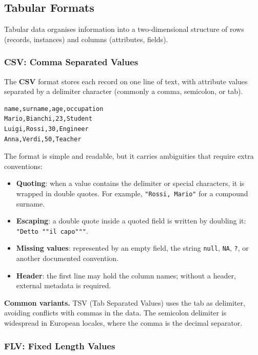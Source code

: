 \subsection{Tabular Formats}
\label{sec:tabular-formats}

Tabular data organises information into a two-dimensional structure of rows (records, instances) and columns (attributes, fields).

\subsubsection{CSV: Comma Separated Values}
\label{subsec:csv-format}

The \textbf{CSV} format stores each record on one line of text, with attribute values separated by a delimiter character (commonly a comma, semicolon, or tab).

\begin{lstlisting}[language={}, basicstyle=\ttfamily\scriptsize]
name,surname,age,occupation
Mario,Bianchi,23,Student
Luigi,Rossi,30,Engineer
Anna,Verdi,50,Teacher
\end{lstlisting}

The format is simple and readable, but it carries ambiguities that require extra conventions:

\begin{itemize}
    \item \textbf{Quoting}: when a value contains the delimiter or special characters, it is wrapped in double quotes. For example, \texttt{"Rossi, Mario"} for a compound surname.
    \item \textbf{Escaping}: a double quote inside a quoted field is written by doubling it: \texttt{"Detto ""il capo"""}.
    \item \textbf{Missing values}: represented by an empty field, the string \texttt{null}, \texttt{NA}, \texttt{?}, or another documented convention.
    \item \textbf{Header}: the first line may hold the column names; without a header, external metadata is required.
\end{itemize}

\begin{notebox}
\textbf{Common variants.}
TSV (Tab Separated Values) uses the tab as delimiter, avoiding conflicts with commas in the data. The semicolon delimiter is widespread in European locales, where the comma is the decimal separator.
\end{notebox}

\subsubsection{FLV: Fixed Length Values}
\label{subsec:flv-format}

